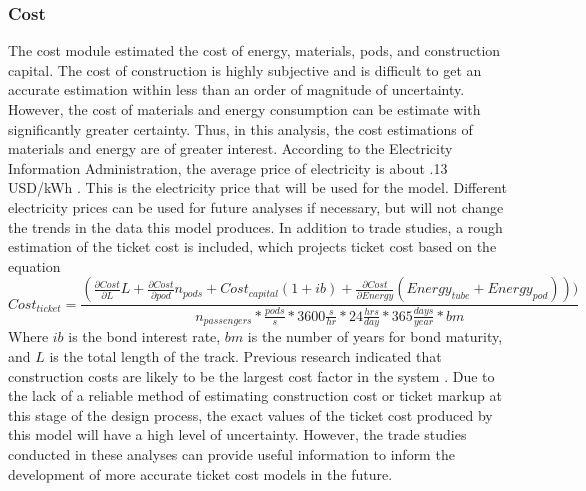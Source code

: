 \subsubsection{Cost}
	The cost module estimated the cost of energy, materials, pods, and construction capital. The cost of construction is highly subjective and is difficult to get an accurate estimation within less than an order of magnitude of uncertainty. However, the cost of materials and energy consumption can be estimate with significantly greater certainty. Thus, in this analysis, the cost estimations of materials and energy are of greater interest. According to the Electricity Information Administration, the average price of electricity is about .13 USD/kWh \cite{EIA}. This is the electricity price that will be used for the model. Different electricity prices can be used for future analyses if necessary, but will not change the trends in the data this model produces. In addition to trade studies, a rough estimation of the ticket cost is included, which projects ticket cost based on the equation
	\begin{equation}
		\label{eq:ticket_cost}
		Cost_{ticket} = \frac{ (\frac{\partial Cost}{\partial L}L+\frac{\partial Cost }{\partial pod}n_{pods}+Cost_{capital} ( 1+ib ) + \frac{\partial Cost}{\partial Energy} (Energy_{tube} + Energy_{pod}  ))  )}{n_{passengers}*\frac{pods}{s}*3600\frac{s}{hr}*24\frac{hrs}{day}*365\frac{days}{year}*bm}
	\end{equation}
	Where $ib$ is the bond interest rate, $bm$ is the number of years for bond maturity, and $L$ is the total length of the track. Previous research indicated that construction costs are likely to be the largest cost factor in the system \cite{Musk}. Due to the lack of a reliable method of estimating construction cost or ticket markup at this stage of the design process, the exact values of the ticket cost produced by this model will have a high level of uncertainty. However, the trade studies conducted in these analyses can provide useful information to inform the development of more accurate ticket cost models in the future.